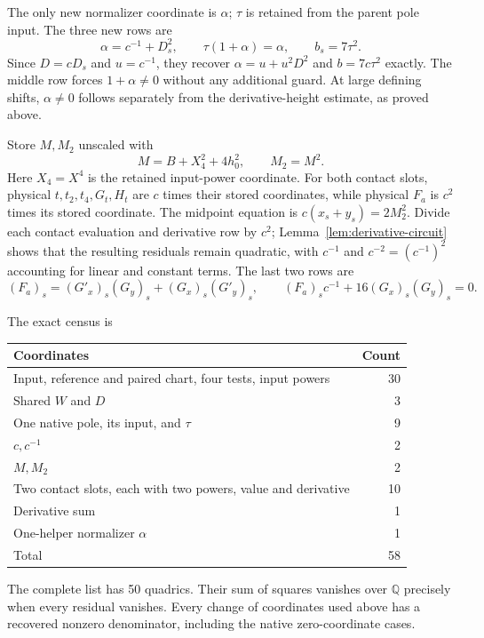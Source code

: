 \documentclass[11pt,a4paper]{article}
\newcommand{\Q}{\mathbb Q}\newcommand{\Z}{\mathbb Z}
\begin{document}
The only new normalizer coordinate is $\alpha$; $\tau$ is retained
from the parent pole input. The three new rows are
\begin{equation}\label{eq:quadratic-gate}
 \alpha=c^{-1}+D_s^2,\qquad
 \tau(1+\alpha)=\alpha,\qquad b_s=7\tau^2.
\end{equation}
Since $D=cD_s$ and $u=c^{-1}$, they recover
$\alpha=u+u^2D^2$ and $b=7c\tau^2$ exactly.
The middle row forces $1+\alpha\ne0$ without any additional guard.
At large defining shifts, $\alpha\ne0$ follows separately from the
derivative-height estimate, as proved above.

Store $M,M_2$ unscaled with
\[
 M=B+X_4^2+4h_0^2,\qquad M_2=M^2.
\]
Here $X_4=X^4$ is the retained input-power coordinate. For both contact
slots, physical $t,t_2,t_4,G_t,H_t$ are $c$ times their stored
coordinates, while physical $F_a$ is $c^2$ times its stored coordinate.
The midpoint equation is $c(x_s+y_s)=2M_2^2$.
Divide each contact evaluation and derivative row by $c^2$;
Lemma~\ref{lem:derivative-circuit} shows that the resulting residuals
remain quadratic, with $c^{-1}$ and $c^{-2}=(c^{-1})^2$ accounting for
linear and constant terms. The last two rows are
\[
 (F_a)_s=(G'_x)_s(G_y)_s+(G_x)_s(G'_y)_s,
 \qquad (F_a)_sc^{-1}+16(G_x)_s(G_y)_s=0.
\]

\begin{samepage}
The exact census is
\begin{center}
\begin{tabular}{lr}
\toprule
Coordinates&Count\\\midrule
Input, reference and paired chart, four tests, input powers&30\\
Shared $W$ and $D$&3\\
One native pole, its input, and $\tau$&9\\
$c,c^{-1}$&2\\
$M,M_2$&2\\
Two contact slots, each with two powers, value and derivative&10\\
Derivative sum&1\\
One-helper normalizer $\alpha$&1\\\midrule
Total&58\\\bottomrule
\end{tabular}
\end{center}
\end{samepage}
The complete list has 50 quadrics. Their sum of squares vanishes over
$\Q$ precisely when every residual vanishes. Every change of coordinates
used above has a recovered nonzero denominator, including the native
zero-coordinate cases.
\end{document}
